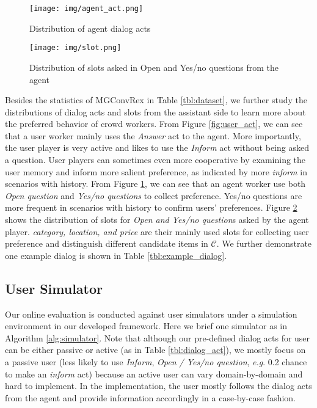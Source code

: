\documentclass[11pt,a4paper]{article}
\makeatletter
\DeclareRobustCommand\onedot{\futurelet\@let@token\@onedot}
\def\onedot{. }
\def\eg{\emph{e.g}\onedot} \def\Eg{\emph{E.g}\onedot}
\makeatother
\begin{document}
\begin{figure}[t]
\centering    
\texttt{[image: img/agent\_act.png]}
    \caption{Distribution of agent dialog acts}
\label{fig:agent_act}
\vspace{-3mm}
\end{figure}

\begin{figure}[b]
\centering    
\texttt{[image: img/slot.png]}
    \caption{Distribution of slots asked in Open and Yes/no questions from the agent}
\label{fig:agent_slot}
\vspace{-3mm}
\end{figure}

Besides the statistics of MGConvRex in Table \ref{tbl:dataset}, we further study the distributions of dialog acts and slots from the assistant side to learn more about the preferred behavior of crowd workers.
From Figure \ref{fig:user_act}, we can see that a user worker mainly uses the \textit{Answer} act to the agent.
More importantly, the user player is very active and likes to use the \textit{Inform} act without being asked a question. 
User players can sometimes even more cooperative by examining the user memory and inform more salient preference, as indicated by more \textit{inform} in scenarios with history.
From Figure \ref{fig:agent_act}, we can see that an agent worker use both \textit{Open question} and \textit{Yes/no questions} to collect preference. Yes/no questions are more frequent in scenarios with history to confirm users' preferences.
Figure \ref{fig:agent_slot} shows the distribution of slots for \textit{Open and Yes/no question}s asked by the agent player. \textit{category, location, and price} are their mainly used slots for collecting user preference and distinguish different candidate items in $\mathcal{C}$.
We further demonstrate one example dialog is shown in Table \ref{tbl:example_dialog}.

\subsection{User Simulator}
Our online evaluation is conducted against user simulators under a simulation environment in our developed framework.
Here we brief one simulator as in Algorithm \ref{alg:simulator}. 
Note that although our pre-defined dialog acts for user can be either passive or active (as in Table \ref{tbl:dialog_act}), we mostly focus on a passive user (less likely to use \textit{Inform}, \textit{Open / Yes/no question}, \eg 0.2 chance to make an \textit{inform} act) because an active user can vary domain-by-domain and hard to implement. In the implementation, the user mostly follows the dialog acts from the agent and provide information accordingly in a case-by-case fashion.
\end{document}
